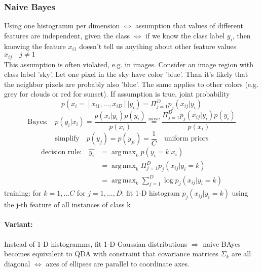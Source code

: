\documentclass[11pt]{article}
\DeclareMathOperator*{\argmax}{arg\,max}
\begin{document}
            \subsubsection{Naive Bayes}
              Using one histogramm per dimension $\iff$ assumption that values of different features are independent,
              given the class $\iff$ if we know the class label $y_i$, then knowing the feature $x_{i1}$ doesn't tell us anything about other feature values $x_{ij} \quad j\neq 1$ \\
              This assumption is often violated, e.g. in images. Consider an image region with class
              label 'sky'. Let one pixel in the sky have color 'blue'. Than it's likely that the neighbor pixels
              are probably also 'blue'. The same applies to other colors (e.g. grey for clouds or red for sunset).
              If assumption is true, joint probability
              \begin{equation*}
                p(x_i=[x_{i1},...,x_{iD}]|y_i) = \Pi_{j=1}^{D}p_j(x_{ij}|y_i)
              \end{equation*}
              \begin{equation*}
                \text{Bayes:} \quad p(y_i|x_i) = \frac{p(x_i|y_i)p(y_i)}{p(x_i)} \overset{\text{naive}}{=}
                \frac{\Pi_{j=1}^D p_j(x_{ij}|y_i)p(y_i)}{p(x_i)}
              \end{equation*}
              \begin{equation*}
                \text{simplify} \quad p(y_j) = p(y_{ji})=\frac{1}{C} \quad \text{uniform priors}
              \end{equation*}
              \begin{equation*}
                \begin{align*}
                  \text{decision rule:} \quad \hat{y_i} &= \argmax_k p(y_i=k|x_i) \\
                  &= \argmax_k \Pi_{j=1}^D p_j(x_{ij}|y_i=k) \\
                  &= \argmax_k \sum_{j=1}^D \log p_j(x_{ij}|y_i=k)
                \end{align*}
              \end{equation*}
              training: for $k=1,...C$ for $j=1,...,D$: fit 1-D histogram $p_j(x_{ij}|y_i=k)$ using the
              j-th feature of all instances of class k

              \paragraph{Variant:} Instead of 1-D histogramms, fit 1-D Gaussian distributions
              $\Rightarrow$ naive BAyes becomes equivalent to QDA with constraint that covariance matrices
              $\Sigma_k$ are all diagonal $\iff$ axes of ellipses are parallel to coordinate axes.
\end{document}
